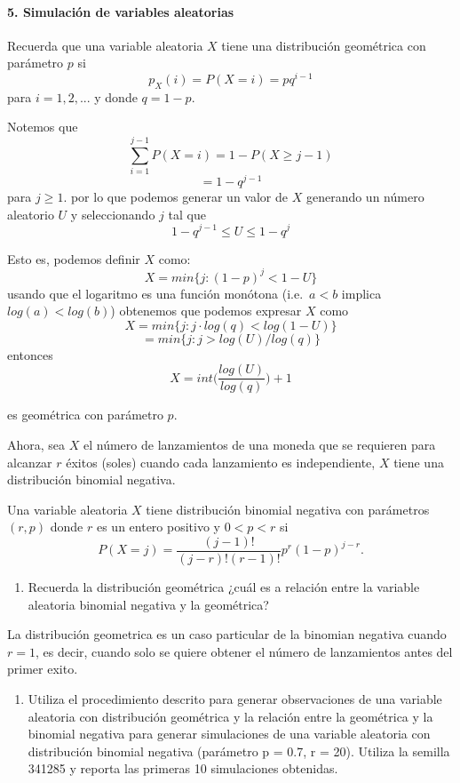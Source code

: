 \documentclass[]{article}
\providecommand{\tightlist}{%
  \setlength{\itemsep}{0pt}\setlength{\parskip}{0pt}}
\let\oldparagraph\paragraph
\renewcommand{\paragraph}[1]{\oldparagraph{#1}\mbox{}}
\begin{document}
\hypertarget{simulacion-de-variables-aleatorias}{%
\paragraph{5. Simulación de variables
aleatorias}\label{simulacion-de-variables-aleatorias}}

Recuerda que una variable aleatoria \(X\) tiene una distribución
geométrica con parámetro \(p\) si \[p_X(i) = P(X=i)=pq^{i-1}\] para
\(i=1,2,...\) y donde \(q=1-p\).

Notemos que \[\sum_{i=1}^{j-1}P(X=i)=1-P(X\geq j-1)\] \[=1 - q^{j-1}\]
para \(j\geq 1\). por lo que podemos generar un valor de \(X\) generando
un número aleatorio \(U\) y seleccionando \(j\) tal que
\[1-q^{j-1} \leq U \leq 1-q^j\]

Esto es, podemos definir \(X\) como: \[X=min\{j : (1-p)^j < 1-U\}\]
usando que el logaritmo es una función monótona (i.e.~\(a<b\) implica
\(log(a)<log(b)\)) obtenemos que podemos expresar \(X\) como
\[X=min\big\{j : j \cdot log(q) < log(1-U)\big\}\]
\[=min\big\{j : j > log(U)/log(q)\big\}\] entonces
\[X= int\bigg(\frac{log(U)}{log(q)}\bigg)+1\]

es geométrica con parámetro \(p\).

Ahora, sea \(X\) el número de lanzamientos de una moneda que se
requieren para alcanzar \(r\) éxitos (soles) cuando cada lanzamiento es
independiente, \(X\) tiene una distribución binomial negativa.

Una variable aleatoria \(X\) tiene distribución binomial negativa con
parámetros \((r,p)\) donde \(r\) es un entero positivo y \(0<p<r\) si
\[P(X=j)=\frac{(j-1)!}{(j-r)!(r-1)!}p^r(1-p)^{j-r}.\]

\begin{enumerate}
\def\labelenumi{\alph{enumi})}
\tightlist
\item
  Recuerda la distribución geométrica ¿cuál es a relación entre la
  variable aleatoria binomial negativa y la geométrica?
\end{enumerate}

La distribución geometrica es un caso particular de la binomian negativa
cuando \(r=1\), es decir, cuando solo se quiere obtener el número de
lanzamientos antes del primer exito.

\begin{enumerate}
\def\labelenumi{\alph{enumi})}
\setcounter{enumi}{1}
\tightlist
\item
  Utiliza el procedimiento descrito para generar observaciones de una
  variable aleatoria con distribución geométrica y la relación entre la
  geométrica y la binomial negativa para generar simulaciones de una
  variable aleatoria con distribución binomial negativa (parámetro p =
  0.7, r = 20). Utiliza la semilla 341285 y reporta las primeras 10
  simulaciones obtenidas.
\end{enumerate}
\end{document}
